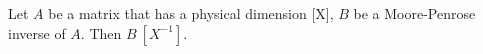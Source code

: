 \begin{remark}
  Let $A$ be a matrix that has a physical dimension [X],
    $B$ be a Moore-Penrose inverse of $A$.
  Then $B\ [X^{-1}]$.
\end{remark}
